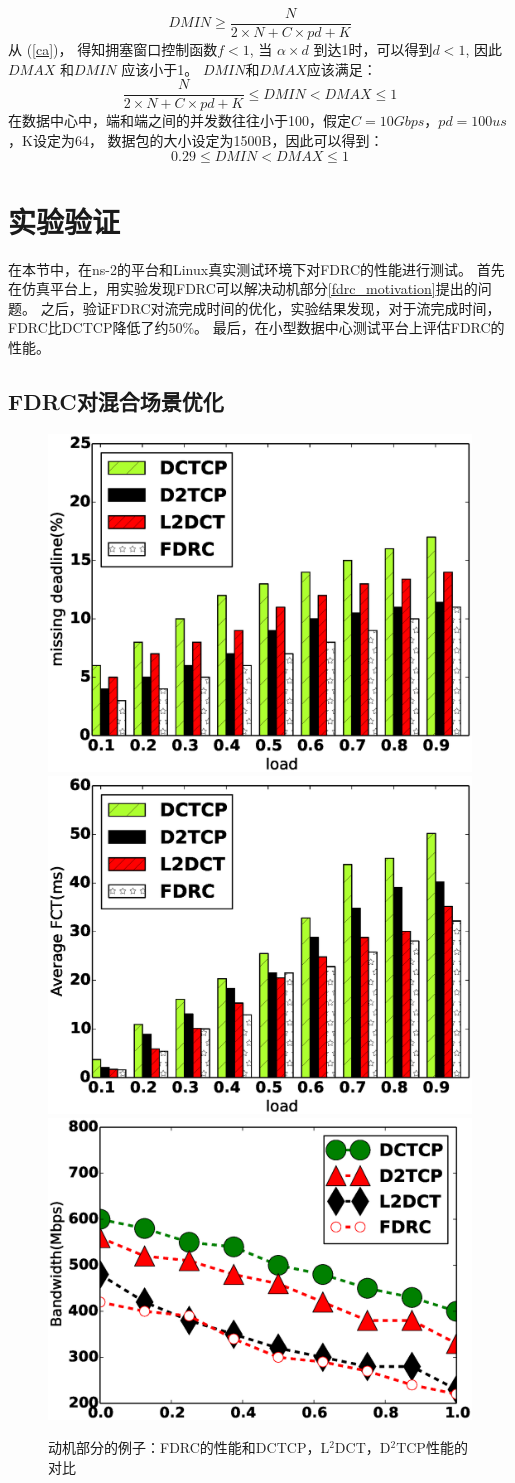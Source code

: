 \begin{equation}
\label{DMAXvalue}
DMIN \ge \frac{N}{2\times N +C \times pd +K}
\end{equation}
从 (\ref{ca})， 得知拥塞窗口控制函数$f<1$, 当 $\alpha \times d$ 到达1时，可以得到$d<1$,
因此$DMAX$ 和$DMIN$ 应该小于1。
$DMIN$和$DMAX$应该满足：
\begin{equation}
\label{DMAXDMIN}
\frac{N}{2\times N +C \times pd +K} \le DMIN < DMAX \le1
\end{equation}
在数据中心中，端和端之间的并发数往往小于100\cite{DCTCP}，假定$C=10Gbps$，$pd=100us$，K设定为64，
数据包的大小设定为1500B，因此可以得到：
\begin{equation}
\label{DMAX_DMIN_RANGE}
0.29 \le DMIN < DMAX \le1
\end{equation}





\section{实验验证}
在本节中，在ns-2的平台和Linux真实测试环境下对FDRC的性能进行测试。
首先在仿真平台上，用实验发现FDRC可以解决动机部分\ref{fdrc_motivation}提出的问题。
之后，验证FDRC对流完成时间的优化，实验结果发现，对于流完成时间，FDRC比DCTCP降低了约$50\%$。
最后，在小型数据中心测试平台上评估FDRC的性能。

\subsection{FDRC对混合场景优化}
\begin{figure}[h]
\centering
{}
 {\includegraphics[width=0.32\columnwidth]{figures/FDRC/evaluation/spineleaf/miss_deadline.eps}}
{\includegraphics[width=0.32\columnwidth]{figures/FDRC/evaluation/spineleaf/fct2.eps}}
{\includegraphics[width=0.32\columnwidth]{figures/FDRC/evaluation/spineleaf/bandwidth.eps}}
\caption{动机部分的例子：FDRC的性能和DCTCP，L$^2$DCT，D$^2$TCP性能的对比}
\label{fdrc-motivation-resolved-fig}
\end{figure}


